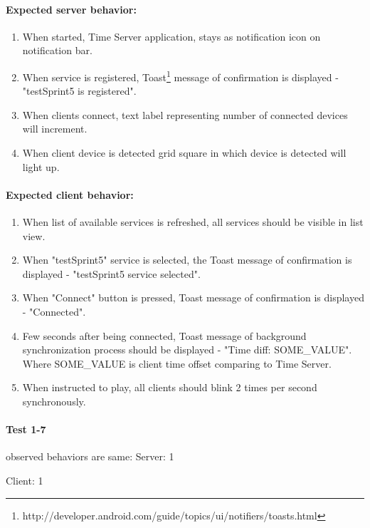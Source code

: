 \paragraph{Expected server behavior:}
\begin{enumerate}
\item When started, Time Server application, stays as notification icon on notification bar.
\item When service is registered, Toast\footnote{http://developer.android.com/guide/topics/ui/notifiers/toasts.html} message of confirmation is displayed - "testSprint5 is registered".
\item When clients connect, text label representing number of connected devices will increment.
\item When client device is detected grid square in which device is detected will light up.
\end{enumerate}


\paragraph{Expected client behavior:}
\begin{enumerate}
\item When list of available services is refreshed, all services should be visible in list view.
\item When "testSprint5" service is selected, the Toast message of confirmation is displayed - "testSprint5 service selected".
\item When "Connect" button is pressed, Toast message of confirmation is displayed - "Connected".
\item Few seconds after being connected, Toast message of background synchronization process should be displayed - "Time diff: SOME\_VALUE". Where SOME\_VALUE is client time offset comparing to Time Server.
\item When instructed to play, all clients should blink 2 times per second synchronously. 
\end{enumerate}

\paragraph{Test 1-7 } observed behaviors are same:
\newline \newline Server:
1    \tick

Client:
1     \cross


